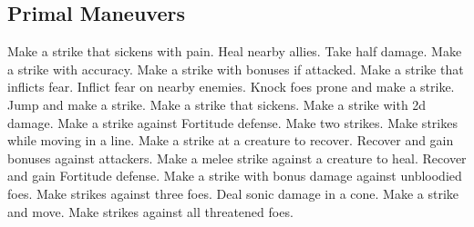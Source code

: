 \subsection{Primal Maneuvers}\label{Primal Maneuvers}
\begin{spelllist}
 Make a strike that sickens with pain.
 Heal nearby allies.
 Take half damage.
 Make a strike with  accuracy.
 Make a strike with bonuses if attacked.
 Make a strike that inflicts fear.
 Inflict fear on nearby enemies.
 Knock foes prone and make a strike.
 Jump and make a strike.
 Make a strike that sickens.
 Make a strike with \plus2d damage.
 Make a strike against Fortitude defense.
 Make two strikes.
 Make strikes while moving in a line.
 Make a strike at a creature to recover.
 Recover and gain bonuses against attackers.
 Make a melee strike against a creature to heal.
 Recover and gain  Fortitude defense.
 Make a strike with bonus damage against unbloodied foes.
 Make strikes against three foes.
 Deal sonic damage in a cone.
 Make a strike and move.
 Make strikes against all threatened foes.
\end{spelllist}



\small
